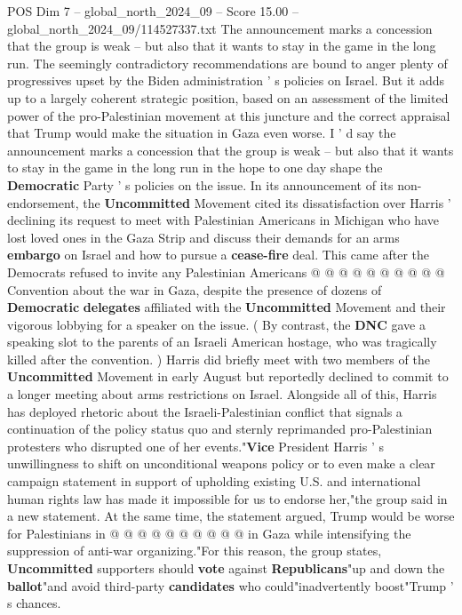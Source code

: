 \begin{textsample}{POS Dim 7 – global\_north\_2024\_09 – Score 15.00 – global\_north\_2024\_09/114527337.txt}  \label{ex:f7_pos_072}
The announcement marks a concession that the group is weak -- but also that it wants to stay in the game in the long run.
The seemingly contradictory recommendations are bound to anger plenty of progressives upset by the Biden administration ' s policies on Israel.
But it adds up to a largely coherent strategic position, based on an assessment of the limited power of the pro-Palestinian movement at this juncture and the correct appraisal that Trump would make the situation in Gaza even worse.
I ' d say the announcement marks a concession that the group is weak -- but also that it wants to stay in the game in the long run in the hope to one day shape the \textbf{Democratic} Party ' s policies on the issue.
In its announcement of its non-endorsement, the \textbf{Uncommitted} Movement cited its dissatisfaction over Harris ' declining its request to meet with Palestinian Americans in Michigan who have lost loved ones in the Gaza Strip and discuss their demands for an arms \textbf{embargo} on Israel and how to pursue a \textbf{cease-fire} deal.
This came after the Democrats refused to invite any Palestinian Americans @ @ @ @ @ @ @ @ @ @ Convention about the war in Gaza, despite the presence of dozens of \textbf{Democratic} \textbf{delegates} affiliated with the \textbf{Uncommitted} Movement and their vigorous lobbying for a speaker on the issue. ( By contrast, the \textbf{DNC} gave a speaking slot to the parents of an Israeli American hostage, who was tragically killed after the convention. ) Harris did briefly meet with two members of the \textbf{Uncommitted} Movement in early August but reportedly declined to commit to a longer meeting about arms restrictions on Israel.
Alongside all of this, Harris has deployed rhetoric about the Israeli-Palestinian conflict that signals a continuation of the policy status quo and sternly reprimanded pro-Palestinian protesters who disrupted one of her events."\textbf{Vice} President Harris ' s unwillingness to shift on unconditional weapons policy or to even make a clear campaign statement in support of upholding existing U.S. and international human rights law has made it impossible for us to endorse her,"the group said in a new statement.
At the same time, the statement argued, Trump would be worse for Palestinians in @ @ @ @ @ @ @ @ @ @ in Gaza while intensifying the suppression of anti-war organizing."For this reason, the group states, \textbf{Uncommitted} supporters should \textbf{vote} against \textbf{Republicans}"up and down the \textbf{ballot}"and avoid third-party \textbf{candidates} who could"inadvertently boost"Trump ' s chances.

\end{textsample}
